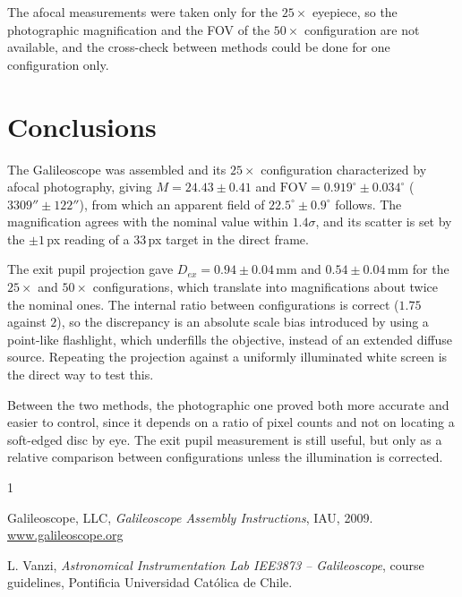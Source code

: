 \documentclass[conference]{IEEEtran}
\begin{document}
The afocal measurements were taken only for the $25\times$ eyepiece, so
the photographic magnification and the FOV of the $50\times$
configuration are not available, and the cross-check between methods could be
done for one configuration only.

\section{Conclusions}
\label{sec:concl}

The Galileoscope was assembled and its $25\times$ configuration
characterized by afocal photography, giving $M = 24.43 \pm 0.41$ and
$\mathrm{FOV} = 0.919^\circ \pm 0.034^\circ$ ($3309'' \pm 122''$), from which an
apparent field of $22.5^\circ \pm 0.9^\circ$ follows. The magnification agrees
with the nominal value within $1.4\sigma$, and its scatter is set by the
$\pm 1$\,px reading of a 33\,px target in the direct frame.

The exit pupil projection gave $D_{ex} = 0.94 \pm 0.04$\,mm and
$0.54 \pm 0.04$\,mm for the $25\times$ and $50\times$ configurations,
which translate into magnifications about twice the nominal ones. The internal
ratio between configurations is correct ($1.75$ against $2$), so the
discrepancy is an absolute scale bias introduced by using a point-like
flashlight, which underfills the objective, instead of an extended diffuse
source. Repeating the projection against a uniformly illuminated white screen
is the direct way to test this.

Between the two methods, the photographic one proved both more accurate and
easier to control, since it depends on a ratio of pixel counts and not on
locating a soft-edged disc by eye. The exit pupil measurement is still useful,
but only as a relative comparison between configurations unless the
illumination is corrected.

\begin{thebibliography}{1}

Galileoscope, LLC, \emph{Galileoscope Assembly Instructions}, IAU, 2009.
\url{www.galileoscope.org}

L. Vanzi, \emph{Astronomical Instrumentation Lab IEE3873 -- Galileoscope},
course guidelines, Pontificia Universidad Cat\'olica de Chile.

\end{thebibliography}
\end{document}

